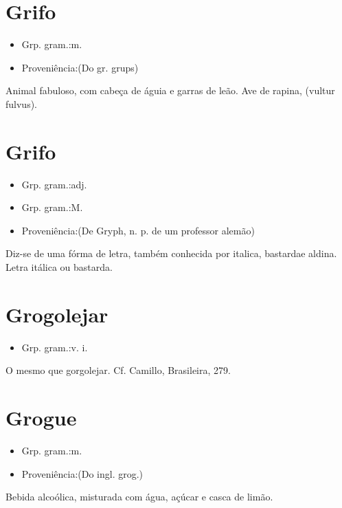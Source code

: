 \section{Grifo}
\begin{itemize}
\item {Grp. gram.:m.}
\end{itemize}
\begin{itemize}
\item {Proveniência:(Do gr. \textunderscore grups\textunderscore )}
\end{itemize}
Animal fabuloso, com cabeça de águia e garras de leão.
Ave de rapina, (\textunderscore vultur fulvus\textunderscore ).
\section{Grifo}
\begin{itemize}
\item {Grp. gram.:adj.}
\end{itemize}
\begin{itemize}
\item {Grp. gram.:M.}
\end{itemize}
\begin{itemize}
\item {Proveniência:(De \textunderscore Gryph\textunderscore , n. p. de um professor alemão)}
\end{itemize}
Diz-se de uma fórma de letra, também conhecida por \textunderscore italica\textunderscore , \textunderscore bastarda\textunderscore  e \textunderscore aldina\textunderscore .
Letra itálica ou bastarda.
\section{Grogolejar}
\begin{itemize}
\item {Grp. gram.:v. i.}
\end{itemize}
O mesmo que \textunderscore gorgolejar\textunderscore . Cf. Camillo, \textunderscore Brasileira\textunderscore , 279.
\section{Grogue}
\begin{itemize}
\item {Grp. gram.:m.}
\end{itemize}
\begin{itemize}
\item {Proveniência:(Do ingl. \textunderscore grog\textunderscore .)}
\end{itemize}
Bebida alcoólica, misturada com água, açúcar e casca de limão.
